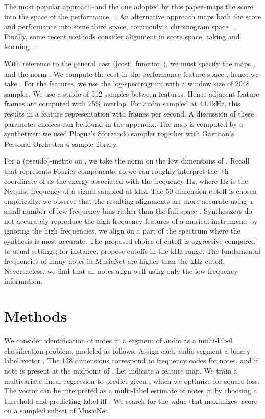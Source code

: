 \documentclass{article} \usepackage{iclr2017_conference,times}
\begin{document}
The most popular approach--and the one adopted by this paper--maps the score into the space of the performance ~\citep{orio,turetsky,soulez}. An alternative approach maps both the score and performance into some third space, commonly a chromogram space ~\citep{dannenberg,izmirli,joder}. Finally, some recent methods consider alignment in score space, taking  and learning ~\citep{garreau,lajugie}.

With reference to the general cost (\ref{cost_function}), we must specify the maps , and the norm . We compute the cost in the performance feature space , hence we take . For the features, we use the log-spectrogram with a window size of 2048 samples. We use a stride of 512 samples between features. Hence adjacent feature frames are computed with 75\% overlap. For audio sampled at 44.1kHz, this results in a feature representation with  frames per second. A discussion of these parameter choices can be found in the appendix. The map  is computed by a synthetizer: we used Plogue's Sforzando sampler together with Garritan's Personal Orchestra 4 sample library.



For a (pseudo)-metric on , we take the  norm  on the low  dimensions of . Recall that  represents Fourier components, so we can roughly interpret the 'th coordinate of  as the energy associated with the frequency Hz, where Hz is the Nyquist frequency of a signal sampled at kHz. The 50 dimension cutoff is chosen empirically: we observe that the resulting alignments are more accurate using a small number of low-frequency bins rather than the full space . Synthesizers do not accurately reproduce the high-frequency features of a musical instrument; by ignoring the high frequencies, we align on a part of the spectrum where the synthesis is most accurate. The proposed choice of cutoff is aggressive compared to usual settings; for instance, \cite{turetsky} propose cutoffs in the kHz range. The fundamental frequencies of many notes in MusicNet are higher than the kHz cutoff. Nevertheless, we find that all notes align well using only the low-frequency information.
 \section{Methods}

We consider identification of notes in a segment of audio  as a multi-label classification problem, modeled as follows. Assign each audio segment a binary label vector . The 128 dimensions correspond to frequency codes for notes, and  if note  is present at the midpoint of . Let  indicate a feature map. We train a multivariate linear regression to predict  given , which we optimize for square loss. The vector  can be interpreted as a multi-label estimate of notes in  by choosing a threshold  and predicting label  iff . We search for the value  that maximizes -score on a sampled subset of MusicNet.
\end{document}
